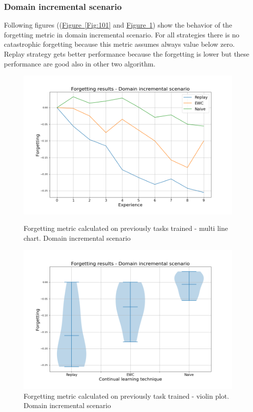 \documentclass[english, LaM, oneside]{sapthesis}%
\begin{document}
\subsubsection{Domain incremental scenario}
Following figures ((\hyperref[Fig:101]{Figure~\ref*{Fig:101}} and \hyperref[Fig:102]{Figure~\ref*{Fig:102}}) show the behavior of the forgetting metric in domain incremental scenario. For all strategies there is no catastrophic forgetting because this metric assumes always value below zero. Replay strategy gets better performance because the forgetting is lower but these performance are good also in other two algorithm. 
\begin{figure}[!h]
   \begin{minipage}{0.48\textwidth}
     \centering
     \includegraphics[width=1.1\linewidth]{overview_forgetting_ni.png}
     \caption{Forgetting metric calculated on previously tasks trained - multi line chart. Domain incremental scenario}\label{Fig:101}
   \end{minipage}\hfill
   \begin{minipage}{0.48\textwidth}
     \centering
     \includegraphics[width=1.1\linewidth]{overview2_forgetting_ni.png}
     \caption{Forgetting metric calculated on previously task trained - violin plot. Domain incremental scenario}\label{Fig:102}
   \end{minipage}
\end{figure}
\end{document}
